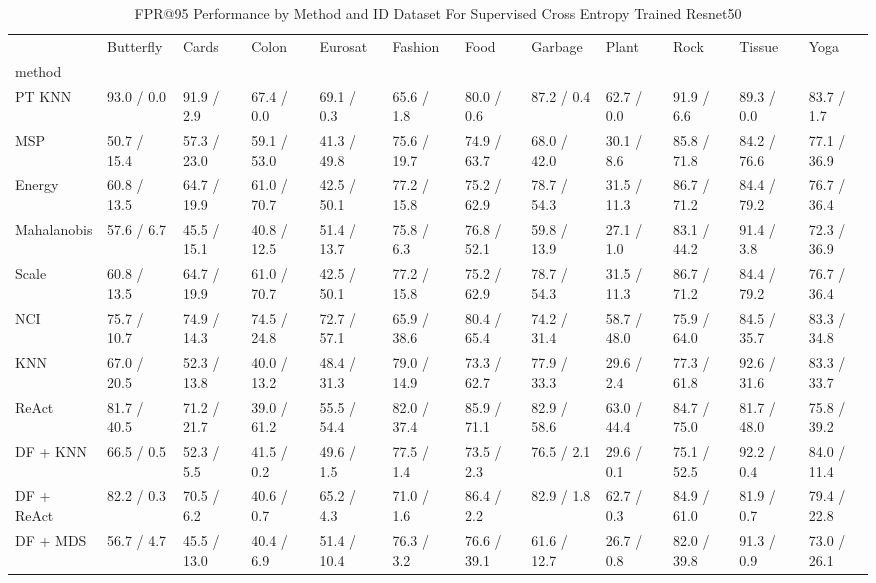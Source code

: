 \documentclass[letterpaper]{article} %
\theoremstyle{plain}
\theoremstyle{definition}
\theoremstyle{remark}
\begin{document}
\begin{sidewaystable}
\caption{FPR@95 Performance by Method and ID Dataset For Supervised Cross Entropy Trained Resnet50}

\label{tab:fpr95_results_resnet}
\begin{tabular}{llllllllllll}
\toprule
  & Butterfly & Cards & Colon & Eurosat & Fashion & Food & Garbage & Plant & Rock & Tissue & Yoga \\
method &  &  &  &  &  &  &  &  &  &  &  \\
\midrule
PT KNN & 93.0 / 0.0 & 91.9 / 2.9 & 67.4 / 0.0 & 69.1 / 0.3 & 65.6 / 1.8 & 80.0 / 0.6 & 87.2 / 0.4 & 62.7 / 0.0 & 91.9 / 6.6 & 89.3 / 0.0 & 83.7 / 1.7 \\
MSP & 50.7 / 15.4 & 57.3 / 23.0 & 59.1 / 53.0 & 41.3 / 49.8 & 75.6 / 19.7 & 74.9 / 63.7 & 68.0 / 42.0 & 30.1 / 8.6 & 85.8 / 71.8 & 84.2 / 76.6 & 77.1 / 36.9 \\
Energy & 60.8 / 13.5 & 64.7 / 19.9 & 61.0 / 70.7 & 42.5 / 50.1 & 77.2 / 15.8 & 75.2 / 62.9 & 78.7 / 54.3 & 31.5 / 11.3 & 86.7 / 71.2 & 84.4 / 79.2 & 76.7 / 36.4 \\
Mahalanobis & 57.6 / 6.7 & 45.5 / 15.1 & 40.8 / 12.5 & 51.4 / 13.7 & 75.8 / 6.3 & 76.8 / 52.1 & 59.8 / 13.9 & 27.1 / 1.0 & 83.1 / 44.2 & 91.4 / 3.8 & 72.3 / 36.9 \\
Scale & 60.8 / 13.5 & 64.7 / 19.9 & 61.0 / 70.7 & 42.5 / 50.1 & 77.2 / 15.8 & 75.2 / 62.9 & 78.7 / 54.3 & 31.5 / 11.3 & 86.7 / 71.2 & 84.4 / 79.2 & 76.7 / 36.4 \\
NCI & 75.7 / 10.7 & 74.9 / 14.3 & 74.5 / 24.8 & 72.7 / 57.1 & 65.9 / 38.6 & 80.4 / 65.4 & 74.2 / 31.4 & 58.7 / 48.0 & 75.9 / 64.0 & 84.5 / 35.7 & 83.3 / 34.8 \\
KNN & 67.0 / 20.5 & 52.3 / 13.8 & 40.0 / 13.2 & 48.4 / 31.3 & 79.0 / 14.9 & 73.3 / 62.7 & 77.9 / 33.3 & 29.6 / 2.4 & 77.3 / 61.8 & 92.6 / 31.6 & 83.3 / 33.7 \\
ReAct & 81.7 / 40.5 & 71.2 / 21.7 & 39.0 / 61.2 & 55.5 / 54.4 & 82.0 / 37.4 & 85.9 / 71.1 & 82.9 / 58.6 & 63.0 / 44.4 & 84.7 / 75.0 & 81.7 / 48.0 & 75.8 / 39.2 \\
DF + KNN & 66.5 / 0.5 & 52.3 / 5.5 & 41.5 / 0.2 & 49.6 / 1.5 & 77.5 / 1.4 & 73.5 / 2.3 & 76.5 / 2.1 & 29.6 / 0.1 & 75.1 / 52.5 & 92.2 / 0.4 & 84.0 / 11.4 \\
DF + ReAct & 82.2 / 0.3 & 70.5 / 6.2 & 40.6 / 0.7 & 65.2 / 4.3 & 71.0 / 1.6 & 86.4 / 2.2 & 82.9 / 1.8 & 62.7 / 0.3 & 84.9 / 61.0 & 81.9 / 0.7 & 79.4 / 22.8 \\
DF + MDS & 56.7 / 4.7 & 45.5 / 13.0 & 40.4 / 6.9 & 51.4 / 10.4 & 76.3 / 3.2 & 76.6 / 39.1 & 61.6 / 12.7 & 26.7 / 0.8 & 82.0 / 39.8 & 91.3 / 0.9 & 73.0 / 26.1 \\
\bottomrule
\end{tabular}

\end{sidewaystable}
\end{document}

